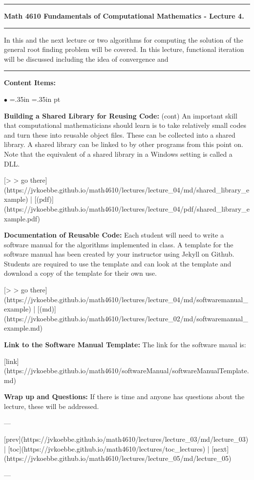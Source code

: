 \documentclass[10pt,fleqn]{article}
\begin{document}
\vskip0.1in\hrule\vskip0.1in
\noindent
{\bf Math 4610 Fundamentals of Computational Mathematics  - Lecture 4.} 
\vskip0.1in\hrule\vskip0.1in
\noindent
In this and the next lecture or two algorithms for computing the solution of
the general root finding problem will be covered. In this lecture, functional
iteration will be discussed including the idea of convergence and
\vskip0.1in\hrule\vskip0.1in
\noindent
{\bf Content Items:}
\begin{list}{$\bullet$}{ \parsep=0pt \listparindent=0pt
\topsep=0pt \rightmargin=.35in \leftmargin=.35in  pt
\itemsep=2pt}
  \item {\bf Building a Shared Library for Reusing Code:} (cont) An important
     skill that computational mathematicians should learn is to take relatively
     small codes and turn these into reusable object files. These can be
     collected into a shared library. A shared library can be linked to by other
     programs from this point on. Note that the equivalent of a shared library
     in a Windows setting is called a DLL.

       [> > go there](https://jvkoebbe.github.io/math4610/lectures/lecture_04/md/shared_library_example)
       | [(pdf)](https://jvkoebbe.github.io/math4610/lectures/lecture_04/pdf/shared_library_example.pdf)

  \item {\bf Documentation of Reusable Code:}  Each student will need to write a
     software manual for the algorithms implemented in class. A template for the
     software manual has been created by your instructor using Jekyll on Github.
     Students are required to use the template and can look at the template and
     download a copy of the template for their own use.

       [> > go there](https://jvkoebbe.github.io/math4610/lectures/lecture_04/md/softwaremanual_example)
       | [(md)](https://jvkoebbe.github.io/math4610/lectures/lecture_02/md/softwaremanual_example.md)

  \item {\bf Link to the Software Manual Template:} The link for the software
     maual is:

     [link](https://jvkoebbe.github.io/math4610/softwareManual/softwareManualTemplate.md)

  \item {\bf Wrap up and Questions:}  If there is time and anyone has questions
     about the lecture, these will be addressed.

\end{list}

---

[prev](https://jvkoebbe.github.io/math4610/lectures/lecture_03/md/lecture_03) |
[toc](https://jvkoebbe.github.io/math4610/lectures/toc_lectures) |
[next](https://jvkoebbe.github.io/math4610/lectures/lecture_05/md/lecture_05)

---
\end{document}

